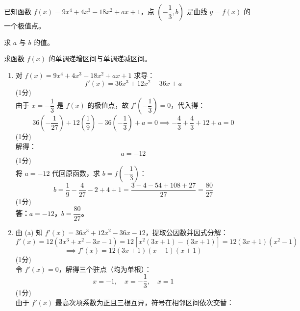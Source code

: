\documentclass[12pt,a4paper]{exam-zh}
\newcommand{\qscore}[1]{%
    \unskip\nobreak\hfill
    \makebox[0pt][l]{\makebox[4em][r]{(#1\%)}}%
}
\begin{document}
\begin{question}[points = 8]
    已知函数 $f(x) = 9x^4 + 4x^3 - 18x^2 + ax + 1$，点 $\left(-\dfrac{1}{3}, b\right)$ 是曲线 $y = f(x)$ 的一个极值点。

    \begin{questionparts}
        \item 求 $a$ 与 $b$ 的值。 \qscore{4}

        \item 求函数 $f(x)$ 的单调递增区间与单调递减区间。 \qscore{4}
    \end{questionparts}
\end{question}

\begin{solution}
    \begin{enumerate}[label=(\alph*)]
        \item 对 $f(x) = 9x^4 + 4x^3 - 18x^2 + ax + 1$ 求导： \\
        $$f'(x) = 36x^3 + 12x^2 - 36x + a$$ \hfill (1分) \\
        由于 $x = -\dfrac{1}{3}$ 是 $f(x)$ 的极值点，故 $f'\left(-\dfrac{1}{3}\right) = 0$，代入得： \\
        $$36\left(-\frac{1}{27}\right) + 12\left(\frac{1}{9}\right) - 36\left(-\frac{1}{3}\right) + a = 0 \implies -\frac{4}{3} + \frac{4}{3} + 12 + a = 0$$ \hfill (1分) \\
        解得： \\
        $$a = -12$$ \hfill (1分) \\
        将 $a = -12$ 代回原函数，求 $b = f\left(-\dfrac{1}{3}\right)$： \\
        $$b = \frac{1}{9} - \frac{4}{27} - 2 + 4 + 1 = \frac{3 - 4 - 54 + 108 + 27}{27} = \frac{80}{27}$$ \hfill (1分) \\
        \textbf{答：$a = -12$，$b = \dfrac{80}{27}$。}

        \item 由 (a) 知 $f'(x) = 36x^3 + 12x^2 - 36x - 12$，提取公因数并因式分解： \\
        $$f'(x) = 12(3x^3 + x^2 - 3x - 1) = 12\left[x^2(3x+1) - (3x+1)\right] = 12(3x+1)(x^2-1)$$
        $$\implies f'(x) = 12(3x+1)(x-1)(x+1)$$ \hfill (1分) \\
        令 $f'(x) = 0$，解得三个驻点（均为单根）： \\
        $$x = -1, \quad x = -\frac{1}{3}, \quad x = 1$$ \hfill (1分) \\
        由于 $f'(x)$ 最高次项系数为正且三根互异，符号在相邻区间依次交替：


\end{enumerate}
\end{solution}
\end{document}
